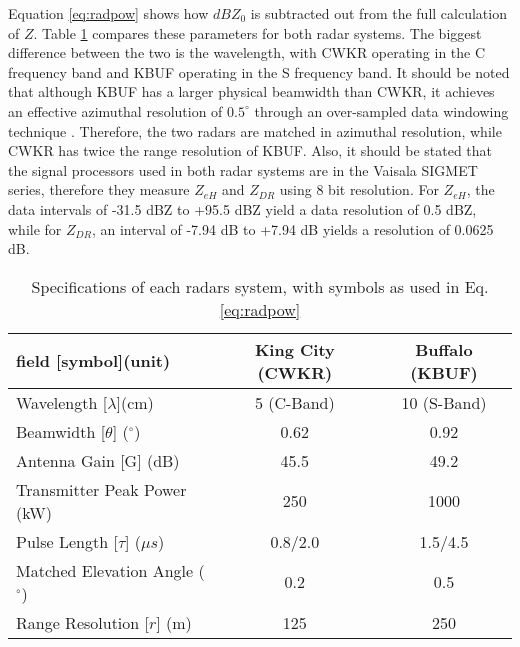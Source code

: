 Equation \ref{eq:radpow} shows how $dBZ_0$ is subtracted out from the full calculation of $Z$. Table \ref{radarspecs} compares these parameters for both radar systems. The biggest difference between the two is the wavelength, with CWKR operating in the C frequency band and KBUF operating in the S frequency band. It should be noted that although KBUF has a larger physical beamwidth than CWKR, it achieves an effective azimuthal resolution of $0.5^{\circ}$ through an over-sampled data windowing technique \citep{Torres2007}. Therefore, the two radars are matched in azimuthal resolution, while CWKR has twice the range resolution of KBUF. Also, it should be stated that the signal processors used in both radar systems are in the Vaisala SIGMET series, therefore they measure $Z_{eH}$ and $Z_{DR}$ using 8 bit resolution. For $Z_{eH}$, the data intervals of -31.5 dBZ to +95.5 dBZ yield a data resolution of 0.5 dBZ, while for $Z_{DR}$, an interval of -7.94 dB to +7.94 dB yields a resolution of 0.0625 dB.

\begin{table}[h]
    \caption{Specifications of each radars system, with symbols as used in Eq. \ref{eq:radpow}}\label{radarspecs}
    \begin{center}
    \begin{tabular}{|l|c|c|}
    \hline
     field [symbol](unit) & King City (CWKR) & Buffalo (KBUF) \\
    \hline\hline
    Wavelength [$\lambda$](cm) & 5 (C-Band) & 10 (S-Band) \\
    \hline
    Beamwidth [$\theta$] ($^\circ$)  & 0.62  & 0.92 \\
    \hline
     Antenna Gain [G] (dB) & 45.5 & 49.2 \\
    \hline
     Transmitter Peak Power (kW) & 250 & 1000 \\
    \hline
     Pulse Length [$\tau$] ($\mu s$) &  0.8/2.0 & 1.5/4.5 \\
    \hline
     Matched Elevation Angle ($^\circ$) & 0.2 & 0.5 \\
    \hline
     Range Resolution [$r$] (m)& 125 & 250 \\
    \hline
    \end{tabular}
    \end{center}
\end{table}



